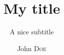 \documentclass{styles/mastersthesis-style}  %
\title{My title} %
\subtitle{A nice subtitle}                     %
\author{John \textsc{Doe}}                     %
\begin{document}
  \maketitle
  \backcoverpage
\end{document}
